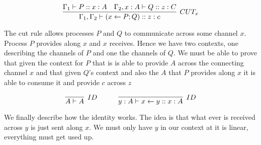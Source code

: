 \documentclass{article}
\begin{document}
\[
\infer[{CUT_x}]
    {\Gamma_1 , \Gamma_2 \vdash ( x \leftarrow P ; Q ) :: z :c }
    { \Gamma_1 \vdash P :: x :A & \Gamma_2 , x:A \vdash Q :: z:C }
\]

The cut rule allows processes \(P\) and \(Q\) to communicate across some channel \(x\). Process \(P\) provides along \(x\) and \(x\) receives. Hence we have two contexts, one describing the channels of \(P\) and one the channels of \(Q\). We must be able to prove that given the context for \(P\) that is is able to provide \(A\) across the connecting channel \(x\) and that given \(Q\)'s context and also the \(A\) that \(P\) provides along \(x\) it is able to consume it and provide \(c\) across \(z\)

\[
\infer[{ID}]
    {A \vdash A}
    {  }
\hspace{3em}   
\infer[{ID}]
    { y:A \vdash x \leftarrow y :: x : A}
    { }
\]

We finally describe how the identity works. The idea is that what ever is received across \(y\) is just sent along \(x\). We must only have \(y\) in our context at it is linear, everything must get used up. 

	
	
	
	
	
	
	
	
	
\end{document}
